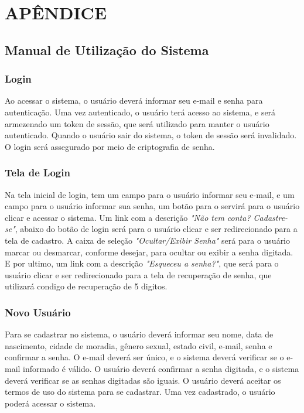\documentclass[../main.tex]{subfiles}
\begin{document}
\section{APÊNDICE}
\subsection{Manual de Utilização do Sistema}

\subsubsection{Login}
Ao acessar o sistema, o usuário deverá informar seu e-mail e senha para autenticação. Uma
vez autenticado, o usuário terá acesso ao sistema, e será armezenado um token de sessão,
que será utilizado para manter o usuário autenticado. Quando o usuário sair do sistema, o
token de sessão será invalidado. O login será assegurado por meio de criptografia de senha.
\subsubsection{Tela de Login}
Na tela inicial de login, tem um campo para o usuário informar seu e-mail, e um campo para 
o usuário informar sua senha, um botão para o servirá para o usuário clicar e acessar o 
sistema. Um link com a descrição \textit{"Não tem conta? Cadastre-se"}, abaixo do botão 
de login será para o usuário clicar e ser redirecionado para a tela de cadastro. A caixa 
de seleção \textit{"Ocultar/Exibir Senha"} será para o usuário marcar ou desmarcar, 
conforme desejar, para ocultar ou exibir a senha digitada. E por ultimo, um link com a
descrição \textit{"Esqueceu a senha?"}, que será para o usuário clicar e ser redirecionado
para a tela de recuperação de senha, que utilizará condigo de recuperação de 5 digitos.
\subsubsection{Novo Usuário}
Para se cadastrar no sistema, o usuário deverá informar seu nome, data de nascimento, 
cidade de moradia, gênero sexual, estado civil, e-mail, senha e confirmar a senha. 
O e-mail deverá ser único, e o sistema deverá verificar se o e-mail informado é válido. 
O usuário deverá confirmar a senha digitada, e o sistema deverá verificar se as senhas
digitadas são iguais. O usuário deverá aceitar os termos de uso do sistema para se 
cadastrar. Uma vez cadastrado, o usuário poderá acessar o sistema.
\end{document}

